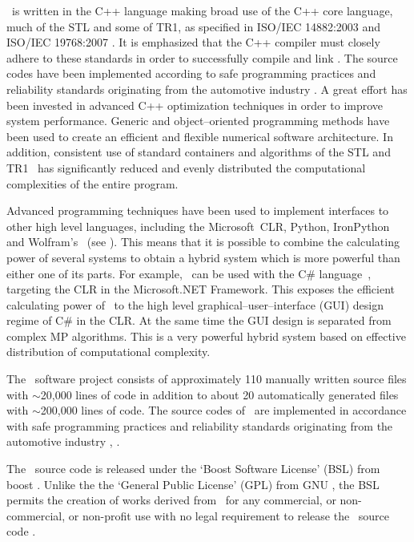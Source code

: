 \efloat\ is written in the C++ language making broad use of the
C++ core language, much of the STL and some of TR1,
as specified in ISO/IEC 14882:2003
and ISO/IEC 19768:2007 \cite{isoiec14882:textbook,isoiec19768:textbook}.
It is emphasized that the C++ compiler must closely adhere to
these standards in order to successfully compile and link \efloat.
The source codes have been implemented according to safe programming
practices and reliability standards originating from the automotive industry
\cite{misra:misrac,misra:misracpp}.
A great effort has been invested in advanced C++ optimization techniques
in order to improve system performance.
Generic and object--oriented programming methods have been used
to create an efficient and flexible numerical software architecture.
In addition, consistent use of standard containers and algorithms of the
STL and TR1~\cite{josuttis:textbook,becker:textbook} has significantly
reduced and evenly distributed the computational complexities
of the entire program.

Advanced programming techniques have been used to implement
interfaces to other high level languages, including the
Microsoft{\footnotesize {\textregistered}}~CLR,
Python, Iron\-Python and Wolfram's \mathematica\
(see \cite{isoiec23271:textbook,microsoft:clr,python:website,foord:textbook,ironpython:website,wolfram:textbook}).
This means that it is possible to combine the calculating power of several systems
to obtain a hybrid system which is more powerful than either one of its parts.
For example, \efloat\ can be used with the C\# language~\cite{isoiec23270:textbook},
targeting the CLR in the
Microsoft{\footnotesize {\textregistered}}.NET Framework.
This exposes the efficient calculating power of \efloat\ to the high level
graphical--user--interface (GUI) design regime of C\# in the CLR.
At the same time the GUI design is separated from complex MP algorithms.
This is a very powerful hybrid system based on effective distribution of
computational complexity.

The \efloat\ software project consists of approximately 110 manually written
source files with $\sim$20,000 lines of code in addition to about 20 automatically
generated files with $\sim$200,000 lines of code.
The source codes of \efloat\ are implemented in accordance with safe programming
practices and reliability standards originating from the automotive industry
\cite{misra:misrac}, \cite{misra:misracpp}.

The \efloat\ source code is released under the `Boost Software License' (BSL)
from boost \cite{boostlic:website}. Unlike the the `General Public License' (GPL)
from GNU \cite{gnulic:website}, the BSL permits the creation of works derived from \efloat\
for any commercial, or non-commercial, or non-profit use with no legal requirement
to release the \efloat\ source code \cite{boostlic:website}.

